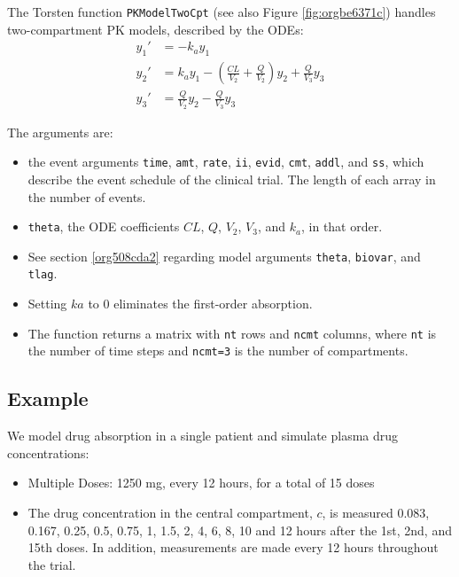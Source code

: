 \documentclass[11pt, reqno, oneside]{amsbook}
\numberwithin{equation}{chapter}
\numberwithin{figure}{chapter}
\numberwithin{table}{chapter}
\theoremstyle{remark}
\begin{document}
The Torsten function \texttt{PKModelTwoCpt} (see also Figure \ref{fig:orgbe6371c}) 
handles two-compartment PK models, described by the ODEs: 
%
\begin{subequations}
  \begin{align} \label{eq:twocpt}
    y_1' &= -k_a y_1 \\
    y_2' &= k_a y_1 - \left(\frac{CL}{V_2} + \frac{Q}{V_2}\right) y_2 +  \frac{Q}{V_3}  y_3  \\ 
    y_3' &= \frac{Q}{V_2} y_2 - \frac{Q}{V_3} y_3
  \end{align}
\end{subequations}

The arguments are:
\begin{itemize}
\item the event arguments \texttt{time}, \texttt{amt}, \texttt{rate}, \texttt{ii}, \texttt{evid}, \texttt{cmt}, \texttt{addl},
  and \texttt{ss}, which describe the event schedule of the clinical
  trial. The length of each array in the number of events.
\item \texttt{theta}, the ODE coefficients \(CL\), \(Q\), \(V_2\), \(V_3\), and \(k_a\), in that order.
\item See section \ref{org508cda2} regarding model arguments \texttt{theta}, \texttt{biovar}, and \texttt{tlag}.
\item Setting \(ka\) to 0 eliminates the first-order absorption.
\item The function returns a matrix with \texttt{nt} rows
and \texttt{ncmt} columns, where \texttt{nt} is the number of time steps and
\texttt{ncmt=3} is the number of compartments.
\end{itemize}

\subsection{Example}
\label{sec:org7f49002}
We model drug absorption in a single patient and simulate plasma drug concentrations:

\begin{itemize}
\item Multiple Doses: 1250 mg, every 12 hours, for a total of 15 doses
\item The drug concentration in the central compartment, \(c\), is 
measured 0.083, 0.167, 0.25, 0.5, 0.75, 1, 1.5, 2, 4, 6,
8, 10 and 12 hours after the 1st, 2nd, and 15th doses. 
In addition, measurements are made every 12 hours throughout the trial.
\end{itemize}
\end{document}
